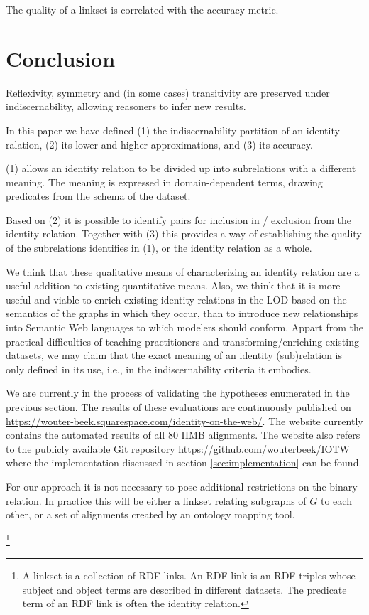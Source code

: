 \documentclass[letterpaper]{article}
\begin{document}
The quality of a linkset is correlated with the accuracy metric.

\section{Conclusion}
\label{sec:conclusion}

Reflexivity, symmetry and (in some cases) transitivity are preserved under indiscernability, allowing reasoners to infer new results.

In this paper we have defined (1) the indiscernability partition of an identity ralation, (2) its lower and higher approximations, and (3) its accuracy.

(1) allows an identity relation to be divided up into subrelations with a different meaning. The meaning is expressed in domain-dependent terms, drawing predicates from the schema of the dataset.

Based on (2) it is possible to identify pairs for inclusion in / exclusion from the identity relation. Together with (3) this provides a way of establishing the quality of the subrelations identifies in (1), or the identity relation as a whole.

We think that these qualitative means of characterizing an identity relation are a useful addition to existing quantitative means. Also, we think that it is more useful and viable to enrich existing identity relations in the LOD based on the semantics of the graphs in which they occur, than to introduce new relationships into Semantic Web languages to which modelers should conform. Appart from the practical difficulties of teaching practitioners and transforming/enriching existing datasets, we may claim that the exact meaning of an identity (sub)relation is only defined in its use, i.e., in the indiscernability criteria it embodies.

We are currently in the process of validating the hypotheses enumerated in the previous section. The results of these evaluations are continuously published on \url{https://wouter-beek.squarespace.com/identity-on-the-web/}. The website currently contains the automated results of all 80 IIMB alignments. The website also refers to the publicly available Git repository \url{https://github.com/wouterbeek/IOTW} where the implementation discussed in section \ref{sec:implementation} can be found.

For our approach it is not necessary to pose additional restrictions on the binary relation. In practice this will be either a linkset relating subgraphs of $G$ to each other, or a set of alignments created by an ontology mapping tool.

\footnote{A linkset is a collection of RDF links. An RDF link is an RDF triples whose subject and object terms are described in different datasets. \cite{void_2011} The predicate term of an RDF link is often the identity relation.}



\end{document}
